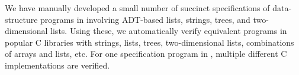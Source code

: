 
We have manually
developed a small
number of succinct specifications of data-structure
programs in \SpecL{}
involving ADT-based
lists, strings, trees, and two-dimensional lists.
Using these,
we automatically verify
equivalent programs in
popular C libraries with
strings, lists, trees, two-dimensional lists,
combinations of arrays and lists, etc.
For one specification program in \SpecL{}, multiple
different C
implementations are verified.



